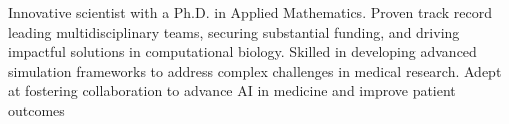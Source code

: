 \par{
Innovative scientist with a Ph.D. in Applied Mathematics. Proven track record leading multidisciplinary teams, securing substantial funding, and driving impactful solutions in computational biology. Skilled in developing advanced simulation frameworks to address complex challenges in medical research. Adept at fostering collaboration to advance AI in medicine and improve patient outcomes
} 